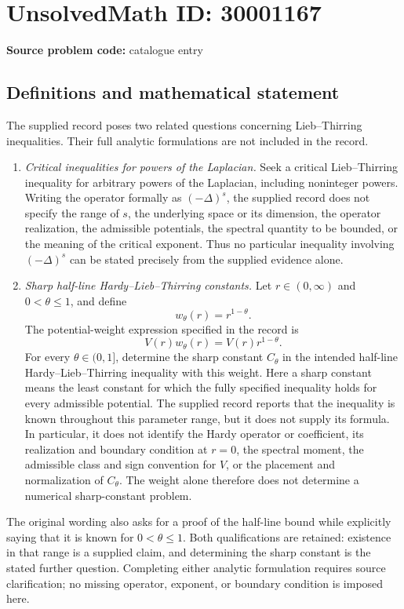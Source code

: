 \documentclass[11pt]{article}
\begin{document}
\section*{UnsolvedMath ID: 30001167}
\textbf{Source problem code:} catalogue entry
\subsection{Definitions and mathematical statement}
The supplied record poses two related questions concerning Lieb--Thirring inequalities. Their full analytic formulations are not included in the record.

\begin{enumerate}
\item \emph{Critical inequalities for powers of the Laplacian.} Seek a critical Lieb--Thirring inequality for arbitrary powers of the Laplacian, including noninteger powers. Writing the operator formally as \(( -\Delta)^s\), the supplied record does not specify the range of \(s\), the underlying space or its dimension, the operator realization, the admissible potentials, the spectral quantity to be bounded, or the meaning of the critical exponent. Thus no particular inequality involving \(( -\Delta)^s\) can be stated precisely from the supplied evidence alone.
\item \emph{Sharp half-line Hardy--Lieb--Thirring constants.} Let \(r\in(0,\infty)\) and \(0<\theta\leq1\), and define
\[
 w_\theta(r)=r^{1-\theta}.
\]
The potential-weight expression specified in the record is
\[
 V(r)w_\theta(r)=V(r)r^{1-\theta}.
\]
For every \(\theta\in(0,1]\), determine the sharp constant \(C_\theta\) in the intended half-line Hardy--Lieb--Thirring inequality with this weight. Here a sharp constant means the least constant for which the fully specified inequality holds for every admissible potential. The supplied record reports that the inequality is known throughout this parameter range, but it does not supply its formula. In particular, it does not identify the Hardy operator or coefficient, its realization and boundary condition at \(r=0\), the spectral moment, the admissible class and sign convention for \(V\), or the placement and normalization of \(C_\theta\). The weight alone therefore does not determine a numerical sharp-constant problem.
\end{enumerate}

The original wording also asks for a proof of the half-line bound while explicitly saying that it is known for \(0<\theta\leq1\). Both qualifications are retained: existence in that range is a supplied claim, and determining the sharp constant is the stated further question. Completing either analytic formulation requires source clarification; no missing operator, exponent, or boundary condition is imposed here.
\end{document}
